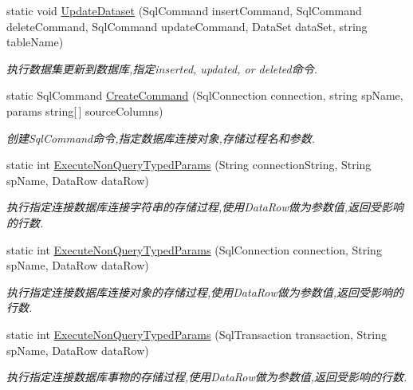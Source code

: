 \begin{DoxyCompactItemize}
static void \hyperlink{class_x_c_l_net_tools_1_1_data_base_1_1_m_s_s_q_l_1_1_sql_helper_ae2e82a516fbbd9314ac030bcaa179459}{Update\+Dataset} (Sql\+Command insert\+Command, Sql\+Command delete\+Command, Sql\+Command update\+Command, Data\+Set data\+Set, string table\+Name)
\begin{DoxyCompactList}\small\item\em 执行数据集更新到数据库,指定inserted, updated, or deleted命令. \end{DoxyCompactList}\item 
static Sql\+Command \hyperlink{class_x_c_l_net_tools_1_1_data_base_1_1_m_s_s_q_l_1_1_sql_helper_ac97a435a58c60f5231454eca755c5584}{Create\+Command} (Sql\+Connection connection, string sp\+Name, params string\mbox{[}$\,$\mbox{]} source\+Columns)
\begin{DoxyCompactList}\small\item\em 创建\+Sql\+Command命令,指定数据库连接对象,存储过程名和参数. \end{DoxyCompactList}\item 
static int \hyperlink{class_x_c_l_net_tools_1_1_data_base_1_1_m_s_s_q_l_1_1_sql_helper_a3261f4f8a7805d20c1d4feed8bd954b2}{Execute\+Non\+Query\+Typed\+Params} (String connection\+String, String sp\+Name, Data\+Row data\+Row)
\begin{DoxyCompactList}\small\item\em 执行指定连接数据库连接字符串的存储过程,使用\+Data\+Row做为参数值,返回受影响的行数. \end{DoxyCompactList}\item 
static int \hyperlink{class_x_c_l_net_tools_1_1_data_base_1_1_m_s_s_q_l_1_1_sql_helper_a9341debc6ce60c624231d4d292e5abe2}{Execute\+Non\+Query\+Typed\+Params} (Sql\+Connection connection, String sp\+Name, Data\+Row data\+Row)
\begin{DoxyCompactList}\small\item\em 执行指定连接数据库连接对象的存储过程,使用\+Data\+Row做为参数值,返回受影响的行数. \end{DoxyCompactList}\item 
static int \hyperlink{class_x_c_l_net_tools_1_1_data_base_1_1_m_s_s_q_l_1_1_sql_helper_a0b022ef626193170ec1e5a4935341cde}{Execute\+Non\+Query\+Typed\+Params} (Sql\+Transaction transaction, String sp\+Name, Data\+Row data\+Row)
\begin{DoxyCompactList}\small\item\em 执行指定连接数据库事物的存储过程,使用\+Data\+Row做为参数值,返回受影响的行数. \end{DoxyCompactList}\item 

\end{DoxyCompactItemize}
